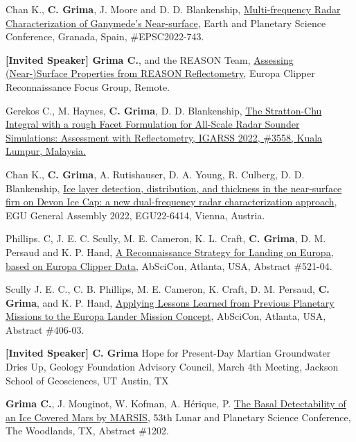 \begin{etaremune}
\item
  Chan K., \textbf{C. Grima}, J. Moore and D. D. Blankenship, \href{https://meetingorganizer.copernicus.org/EPSC2022/EPSC2022-743.html?pdf}{Multi-frequency Radar Characterization of Ganymede's Near-surface}, Earth and Planetary Science Conference, Granada, Spain, \#EPSC2022-743. 
\item
  \textbf{[Invited Speaker] Grima C.}, and the REASON Team, \href{}{Assessing (Near-)Surface Properties from REASON Reflectometry}, Europa Clipper Reconnaissance Focus Group, Remote.
\item
  Gerekos C., M. Haynes, \textbf{C. Grima}, D. D. Blankenship, \href{https://www.igarss2022.org/view_paper.php?PaperNum=3558}{The Stratton-Chu Integral with a rough Facet Formulation for All-Scale Radar Sounder Simulations: Assessment with Reflectometry, IGARSS 2022, \#3558, Kuala Lumpur, Malaysia.}
\item
  Chan K., \textbf{C. Grima}, A. Rutishauser, D. A. Young, R. Culberg, D. D. Blankenship, \href{https://meetingorganizer.copernicus.org/EGU22/EGU22-6414.html}{Ice layer detection, distribution, and thickness in the near-surface firn on Devon Ice Cap: a new dual-frequency radar characterization approach}, EGU General Assembly 2022, EGU22-6414, Vienna, Austria.
\item
  Phillips. C, J. E. C. Scully, M. E. Cameron, K. L. Craft, \textbf{C. Grima}, D. M. Persaud and K. P. Hand, \href{https://agu.confex.com/data/extendedabstract/agu/abscicon21/Paper_1028516_extendedabstract_91715_0.pdf}{A Reconnaissance Strategy for Landing on Europa, based on Europa Clipper Data}, AbSciCon, Atlanta, USA, Abstract \#521-04.
\item
  Scully J. E. C., C. B. Phillips, M. E. Cameron, K. Craft, D. M. Persaud, \textbf{C. Grima}, and K. P. Hand, \href{https://agu.confex.com/data/extendedabstract/agu/abscicon21/Paper_1029989_extendedabstract_90435_0.pdf}{Applying Lessons Learned from Previous Planetary Missions to the Europa Lander Mission Concept}, AbSciCon, Atlanta, USA, Abstract \#406-03.
\item
  \textbf{[Invited Speaker] C. Grima} Hope for Present-Day Martian Groundwater Dries Up, Geology Foundation Advisory Council, March 4th Meeting, Jackson School of Geosciences, UT Austin, TX
\item
  \textbf{Grima C.}, J. Mouginot, W. Kofman, A. Hérique, P. \href{https://www.hou.usra.edu/meetings/lpsc2022/pdf/1202.pdf}{The Basal Detectability of an Ice Covered Mars by MARSIS}, 53th Lunar and Planetary Science Conference, The Woodlands, TX, Abstract \#1202.

\end{etaremune}

